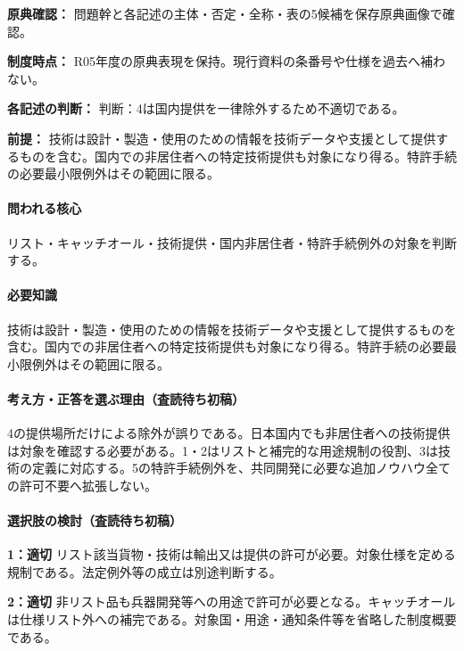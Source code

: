 \noindent\textbf{原典確認：} 問題幹と各記述の主体・否定・全称・表の5候補を保存原典画像で確認。\par

\noindent\textbf{制度時点：} R05年度の原典表現を保持。現行資料の条番号や仕様を過去へ補わない。\par

\noindent\textbf{各記述の判断：} 判断：4は国内提供を一律除外するため不適切である。\par

\noindent\textbf{前提：} 技術は設計・製造・使用のための情報を技術データや支援として提供するものを含む。国内での非居住者への特定技術提供も対象になり得る。特許手続の必要最小限例外はその範囲に限る。\par

\paragraph{問われる核心} リスト・キャッチオール・技術提供・国内非居住者・特許手続例外の対象を判断する。

\paragraph{必要知識} 技術は設計・製造・使用のための情報を技術データや支援として提供するものを含む。国内での非居住者への特定技術提供も対象になり得る。特許手続の必要最小限例外はその範囲に限る。

\paragraph{考え方・正答を選ぶ理由（査読待ち初稿）} 4の提供場所だけによる除外が誤りである。日本国内でも非居住者への技術提供は対象を確認する必要がある。1・2はリストと補完的な用途規制の役割、3は技術の定義に対応する。5の特許手続例外を、共同開発に必要な追加ノウハウ全ての許可不要へ拡張しない。

\paragraph{選択肢の検討（査読待ち初稿）}\mbox{}\par

\noindent\textbf{1：適切} リスト該当貨物・技術は輸出又は提供の許可が必要。対象仕様を定める規制である。法定例外等の成立は別途判断する。\par

\noindent\textbf{2：適切} 非リスト品も兵器開発等への用途で許可が必要となる。キャッチオールは仕様リスト外への補完である。対象国・用途・通知条件等を省略した制度概要である。\par

